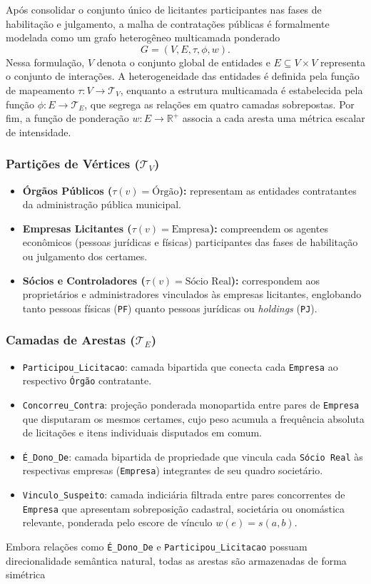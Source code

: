 Após consolidar o conjunto único de licitantes participantes nas fases de habilitação e julgamento, a malha de contratações públicas é formalmente modelada como um grafo heterogêneo multicamada ponderado \begin{equation} G = (V,E,\tau,\phi,w). \end{equation} Nessa formulação, $V$ denota o conjunto global de entidades e $E \subseteq V \times V$ representa o conjunto de interações. A heterogeneidade das entidades é definida pela função de mapeamento $\tau : V \rightarrow \mathcal{T}_V$, enquanto a estrutura multicamada é estabelecida pela função $\phi : E \rightarrow \mathcal{T}_E$, que segrega as relações em quatro camadas sobrepostas. Por fim, a função de ponderação $w : E \rightarrow \mathbb{R}^{+}$ associa a cada aresta uma métrica escalar de intensidade. \subsubsection{Partições de Vértices ($\mathcal{T}_V$)} \begin{itemize} \item \textbf{Órgãos Públicos ($\tau(v)=\text{Órgão}$):} representam as entidades contratantes da administração pública municipal. \item \textbf{Empresas Licitantes ($\tau(v)=\text{Empresa}$):} compreendem os agentes econômicos (pessoas jurídicas e físicas) participantes das fases de habilitação ou julgamento dos certames. \item \textbf{Sócios e Controladores ($\tau(v)=\text{Sócio Real}$):} correspondem aos proprietários e administradores vinculados às empresas licitantes, englobando tanto pessoas físicas (\texttt{PF}) quanto pessoas jurídicas ou \textit{holdings} (\texttt{PJ}). \end{itemize} \subsubsection{Camadas de Arestas ($\mathcal{T}_E$)} \begin{itemize} \item \texttt{Participou\_Licitacao}: camada bipartida que conecta cada \texttt{Empresa} ao respectivo \texttt{Órgão} contratante. \item \texttt{Concorreu\_Contra}: projeção ponderada monopartida entre pares de \texttt{Empresa} que disputaram os mesmos certames, cujo peso acumula a frequência absoluta de licitações e itens individuais disputados em comum. \item \texttt{É\_Dono\_De}: camada bipartida de propriedade que vincula cada \texttt{Sócio Real} às respectivas empresas (\texttt{Empresa}) integrantes de seu quadro societário. \item \texttt{Vinculo\_Suspeito}: camada indiciária filtrada entre pares concorrentes de \texttt{Empresa} que apresentam sobreposição cadastral, societária ou onomástica relevante, ponderada pelo escore de vínculo $w(e)=s(a,b)$. \end{itemize} Embora relações como \texttt{É\_Dono\_De} e \texttt{Participou\_Licitacao} possuam direcionalidade semântica natural, todas as arestas são armazenadas de forma simétrica 